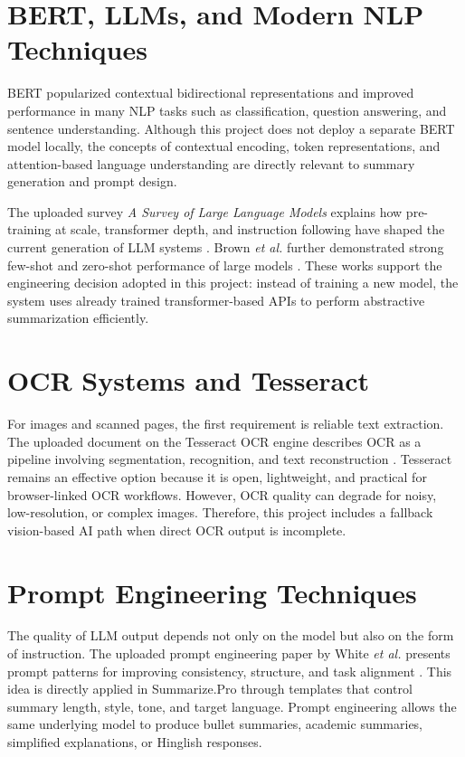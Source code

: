 \documentclass[12pt, a4paper]{report}
\begin{document}
\section{BERT, LLMs, and Modern NLP Techniques}
BERT popularized contextual bidirectional representations and improved performance in many NLP tasks such as classification, question answering, and sentence understanding. Although this project does not deploy a separate BERT model locally, the concepts of contextual encoding, token representations, and attention-based language understanding are directly relevant to summary generation and prompt design.

The uploaded survey \textit{A Survey of Large Language Models} explains how pre-training at scale, transformer depth, and instruction following have shaped the current generation of LLM systems \cite{llmsurvey}. Brown \textit{et al.} further demonstrated strong few-shot and zero-shot performance of large models \cite{fewshot}. These works support the engineering decision adopted in this project: instead of training a new model, the system uses already trained transformer-based APIs to perform abstractive summarization efficiently.

\section{OCR Systems and Tesseract}
For images and scanned pages, the first requirement is reliable text extraction. The uploaded document on the Tesseract OCR engine describes OCR as a pipeline involving segmentation, recognition, and text reconstruction \cite{tesseract}. Tesseract remains an effective option because it is open, lightweight, and practical for browser-linked OCR workflows. However, OCR quality can degrade for noisy, low-resolution, or complex images. Therefore, this project includes a fallback vision-based AI path when direct OCR output is incomplete.

\section{Prompt Engineering Techniques}
The quality of LLM output depends not only on the model but also on the form of instruction. The uploaded prompt engineering paper by White \textit{et al.} presents prompt patterns for improving consistency, structure, and task alignment \cite{promptpattern}. This idea is directly applied in Summarize.Pro through templates that control summary length, style, tone, and target language. Prompt engineering allows the same underlying model to produce bullet summaries, academic summaries, simplified explanations, or Hinglish responses.
\end{document}

